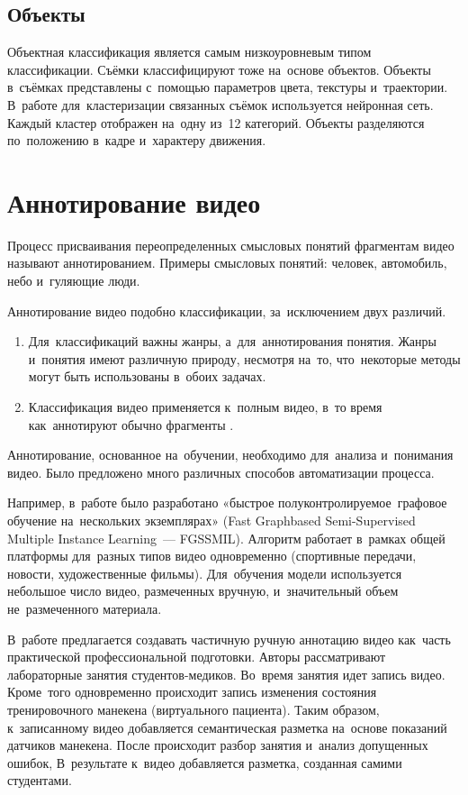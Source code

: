 \subsection{Объекты}

Объектная классификация является самым низкоуровневым типом классификации.
Съёмки классифицируют тоже на~основе объектов.
Объекты в~съёмках представлены с~помощью параметров цвета, текстуры и~траектории.
В~работе \cite{Hong:2005} для~кластеризации связанных съёмок
используется нейронная сеть.
Каждый кластер отображен на~одну из~12 категорий.
Объекты разделяются по~положению в~кадре и~характеру движения.


\section{Аннотирование видео}

Процесс присваивания переопределенных смысловых понятий фрагментам видео
называют аннотированием. Примеры смысловых понятий: человек,
автомобиль, небо и~гуляющие люди.

Аннотирование видео подобно классификации, за~исключением двух различий.
\begin{enumerate}
    \item Для~классификаций важны жанры, а~для~аннотирования понятия.
        Жанры и~понятия имеют различную природу, несмотря на~то,
        что~некоторые методы могут быть использованы в~обоих задачах.
    \item Классификация видео применяется к~полным видео,
        в~то время как~аннотируют обычно фрагменты \cite{Yang:2007}.
\end{enumerate}

Аннотирование, основанное на~обучении, необходимо для~анализа
и~понимания видео. Было предложено много различных способов
автоматизации процесса.

Например, в~работе \cite{Zhang:2012} было
разработано «быстрое
полуконтролируемое\ графовое
обучение на~нескольких экземплярах»
(Fast Graphbased Semi-Supervised Multiple Instance Learning~— FGSSMIL).
Алгоритм работает в~рамках общей платформы для~разных типов видео одновременно
(спортивные передачи, новости, художественные фильмы).
Для~обучения модели используется небольшое число видео, размеченных вручную,
и~значительный объем не~размеченного материала.

В~работе \cite{Weal:2012} предлагается создавать
частичную ручную аннотацию видео
как~часть практической профессиональной подготовки.
Авторы рассматривают лабораторные занятия студентов-медиков.
Во~время занятия идет запись видео.
Кроме~того одновременно происходит запись изменения состояния
тренировочного манекена (виртуального пациента).
Таким образом, к~записанному видео добавляется семантическая разметка
на~основе показаний датчиков манекена.
После происходит разбор занятия и~анализ допущенных ошибок,
В~результате к~видео добавляется разметка, созданная самими студентами.













